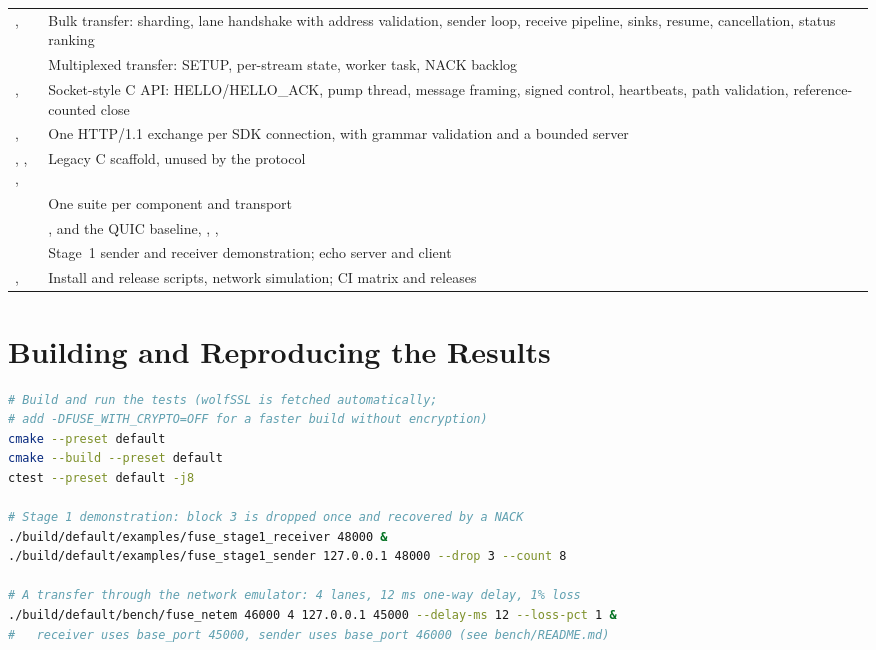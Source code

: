 \begin{xltabular}{\linewidth}{>{\raggedright\arraybackslash}p{4.4cm}X}
,  & Bulk transfer: sharding, lane handshake with address validation, sender loop, receive pipeline, sinks, resume, cancellation, status ranking \\
 & Multiplexed transfer: SETUP, per-stream state, worker task, NACK backlog \\
,  & Socket-style C API: HELLO/HELLO\_ACK, pump thread, message framing, signed control, heartbeats, path validation, reference-counted close \\
,  & One HTTP/1.1 exchange per SDK connection, with grammar validation and a bounded server \\
, , ,  & Legacy C scaffold, unused by the protocol \\
 & One suite per component and transport \\
 & ,  and the QUIC baseline, , ,  \\
 & Stage~1 sender and receiver demonstration; echo server and client \\
,  & Install and release scripts, network simulation; CI matrix and releases \\
\end{xltabular}
\endgroup

\chapter{Building and Reproducing the Results}\label{app:build}

\begin{lstlisting}[language=bash]
# Build and run the tests (wolfSSL is fetched automatically;
# add -DFUSE_WITH_CRYPTO=OFF for a faster build without encryption)
cmake --preset default
cmake --build --preset default
ctest --preset default -j8

# Stage 1 demonstration: block 3 is dropped once and recovered by a NACK
./build/default/examples/fuse_stage1_receiver 48000 &
./build/default/examples/fuse_stage1_sender 127.0.0.1 48000 --drop 3 --count 8

# A transfer through the network emulator: 4 lanes, 12 ms one-way delay, 1% loss
./build/default/bench/fuse_netem 46000 4 127.0.0.1 45000 --delay-ms 12 --loss-pct 1 &
#   receiver uses base_port 45000, sender uses base_port 46000 (see bench/README.md)
\end{lstlisting}

